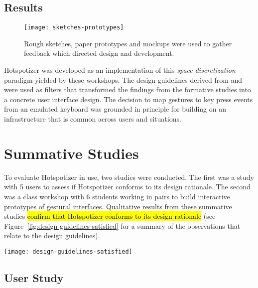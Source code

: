 \subsection{Results}



\begin{figure}[ht]
\centering
\texttt{[image: sketches-prototypes]}
\caption{Rough sketches, paper prototypes and mockups were used to gather feedback which directed design and development.}
\label{fig:sketches-prototypes}
\end{figure}

Hotspotizer was developed as an implementation of this \emph{space discretization} paradigm yielded by these workshops. The design guidelines derived from \textcite{Olsen:2007} and \textcite{Shoemaker:2010} were used as filters that transformed the findings from the formative studies into a concrete user interface design. The decision to map gestures to key press events from an emulated keyboard was grounded in  principle for building on an infrastructure that is common across users and situations.

\section{Summative Studies}
\label{sec:summative-studies}

To evaluate Hotspotizer in use, two studies were conducted. The first was a study with 5 users to assess if Hotspotizer conforms to its design rationale. The second was a class workshop with 6 students working in pairs to build interactive prototypes of gestural interfaces. Qualitative results from these summative studies \hl{confirm that Hotspotizer conforms to its design rationale} (see Figure~\ref{fig:design-guidelines-satisfied} for a summary of the observations that relate to the design guidelines).

\begin{SCfigure}[\sidecaptionrelwidth][ht]
\centering
\texttt{[image: design-guidelines-satisfied]}
\caption{Qualitative findings from two studies affirm that Hotspotizer is in keeping with our design rationale.}
\label{fig:design-guidelines-satisfied}
\end{SCfigure}

\subsection{User Study}

